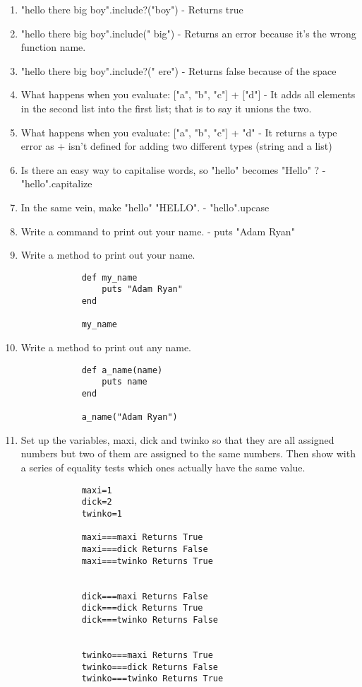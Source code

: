 \documentclass{scrreprt}
\begin{document}
	\begin{enumerate}
		\item "hello there big boy".include?("boy") - Returns true 
		\item "hello there big boy".include(" big") - Returns an error because it's the wrong function name.
		\item "hello there big boy".include?(" ere") - Returns false because of the space
		\item What happens when you evaluate: ["a", "b", "c"] + ["d"]  - It adds all elements in the second list into the first list; that is to say it unions the two.
		\item What happens when you evaluate: ["a", "b", "c"] + "d" - It returns a type error as + isn't defined for adding two different types (string and a list)
		\item Is there an easy way to capitalise words, so "hello" becomes "Hello" ? - "hello".capitalize
		\item In the same vein, make "hello" "HELLO". - "hello".upcase
		\item Write a command to print out your name. - puts "Adam Ryan"
		\item Write a method to print out your name. 
		\begin{verbatim}
			def my_name
				puts "Adam Ryan"
			end 
			
			my_name
		\end{verbatim}
		\item Write a method to print out any name.
		
		\begin{verbatim}
			def a_name(name)
				puts name
			end 
			
			a_name("Adam Ryan")
	\end{verbatim}

		\item Set up the variables, maxi, dick and twinko so that they are all assigned numbers but two of them are assigned to the same numbers. Then show with a series of equality tests which ones actually have the same value.
		
		\begin{verbatim}
			maxi=1
			dick=2
			twinko=1
			
			maxi===maxi Returns True
			maxi===dick Returns False
			maxi===twinko Returns True
			
						
			dick===maxi Returns False
			dick===dick Returns True
			dick===twinko Returns False
			
						
			twinko===maxi Returns True
			twinko===dick Returns False
			twinko===twinko Returns True
			

\end{verbatim}
\end{enumerate}
\end{document}
